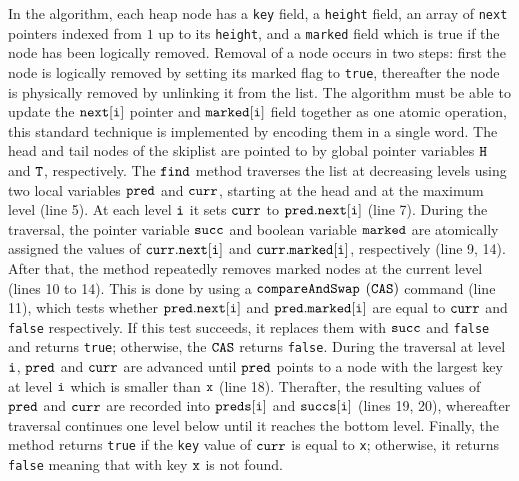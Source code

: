 
In the algorithm, each heap node has a {\tt key} field, a {\tt height} field, an array of {\tt next} pointers indexed from
$1$ up to its {\tt height}, and a {\tt marked} field which is true if the node has been logically removed. Removal of a node occurs in two steps: first the node is logically removed by setting its marked flag to {\tt true}, thereafter the node is physically removed by unlinking it from the list. The algorithm must be able to update the $\tt next[i]$ pointer and $\tt marked[i]$ field together as one atomic operation, this standard technique is implemented by encoding them in a single word. The head and tail nodes of the skiplist are pointed to by global pointer variables $\tt H$ and $\tt T$, respectively. The $\tt find$ method traverses the list at decreasing levels using two local variables $\tt pred$ and $\tt curr$, starting at the head and at 
the maximum level (line 5). At each level $\tt i$ it sets $\tt curr$ to $\tt pred.next[i]$ (line 7). During the traversal, the pointer variable $\tt succ$ and boolean variable $\tt marked$ are atomically assigned the values of $\tt curr.next[i]$ and $\tt curr.marked[i]$, respectively (line 9, 14). After that, the method repeatedly removes marked nodes at the current level (lines 10 to 14). This is done by using a $\tt compareAndSwap$ $\tt (CAS)$ command (line 11), which tests whether $\tt pred.next[i]$ and $\tt pred.marked[i]$ are equal to $\tt curr$ and {\tt false} respectively. If this test succeeds, it replaces them with $\tt succ$ and {\tt false} and returns {\tt true}; otherwise, the $\tt CAS$ returns {\tt false}. During the traversal at level $\tt i$, $\tt pred$ and $\tt curr$ are advanced until $\tt pred$ points to a node with the largest key at level $\tt i$ which is smaller than $\tt x$ (line 18). Therafter, the resulting values of $\tt pred$ and $\tt curr$ are recorded into $\tt preds[i]$ and $\tt succs[i]$ (lines 19, 20), whereafter traversal continues one level below until it reaches the bottom level. Finally, the
method returns {\tt true} if the {\tt key} value of $\tt curr$ is equal to {\tt x}; otherwise, it returns {\tt false} meaning that with key $\tt x$ is not found.



